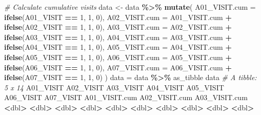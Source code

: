 \documentclass[
]{article}
\newenvironment{Shaded}{\begin{snugshade}}{\end{snugshade}}
\newcommand{\AttributeTok}[1]{\textcolor[rgb]{0.13,0.29,0.53}{#1}}
\newcommand{\CommentTok}[1]{\textcolor[rgb]{0.56,0.35,0.01}{\textit{#1}}}
\newcommand{\DecValTok}[1]{\textcolor[rgb]{0.00,0.00,0.81}{#1}}
\newcommand{\ErrorTok}[1]{\textcolor[rgb]{0.64,0.00,0.00}{\textbf{#1}}}
\newcommand{\FunctionTok}[1]{\textcolor[rgb]{0.13,0.29,0.53}{\textbf{#1}}}
\newcommand{\NormalTok}[1]{#1}
\newcommand{\OtherTok}[1]{\textcolor[rgb]{0.56,0.35,0.01}{#1}}
\newcommand{\SpecialCharTok}[1]{\textcolor[rgb]{0.81,0.36,0.00}{\textbf{#1}}}
\begin{document}
\begin{Shaded}
\begin{Highlighting}[]
\CommentTok{\# Calculate cumulative visits}
\NormalTok{data }\OtherTok{\textless{}{-}}\NormalTok{ data }\SpecialCharTok{\%\textgreater{}\%}
  \FunctionTok{mutate}\NormalTok{(}
    \AttributeTok{A01\_VISIT.cum =} \FunctionTok{ifelse}\NormalTok{(A01\_VISIT }\SpecialCharTok{==} \DecValTok{1}\NormalTok{, }\DecValTok{1}\NormalTok{, }\DecValTok{0}\NormalTok{),}
    \AttributeTok{A02\_VISIT.cum =}\NormalTok{ A01\_VISIT.cum }\SpecialCharTok{+} \FunctionTok{ifelse}\NormalTok{(A02\_VISIT }\SpecialCharTok{==} \DecValTok{1}\NormalTok{, }\DecValTok{1}\NormalTok{, }\DecValTok{0}\NormalTok{),}
    \AttributeTok{A03\_VISIT.cum =}\NormalTok{ A02\_VISIT.cum }\SpecialCharTok{+} \FunctionTok{ifelse}\NormalTok{(A03\_VISIT }\SpecialCharTok{==} \DecValTok{1}\NormalTok{, }\DecValTok{1}\NormalTok{, }\DecValTok{0}\NormalTok{),}
    \AttributeTok{A04\_VISIT.cum =}\NormalTok{ A03\_VISIT.cum }\SpecialCharTok{+} \FunctionTok{ifelse}\NormalTok{(A04\_VISIT }\SpecialCharTok{==} \DecValTok{1}\NormalTok{, }\DecValTok{1}\NormalTok{, }\DecValTok{0}\NormalTok{),}
    \AttributeTok{A05\_VISIT.cum =}\NormalTok{ A04\_VISIT.cum }\SpecialCharTok{+} \FunctionTok{ifelse}\NormalTok{(A05\_VISIT }\SpecialCharTok{==} \DecValTok{1}\NormalTok{, }\DecValTok{1}\NormalTok{, }\DecValTok{0}\NormalTok{),}
    \AttributeTok{A06\_VISIT.cum =}\NormalTok{ A05\_VISIT.cum }\SpecialCharTok{+} \FunctionTok{ifelse}\NormalTok{(A06\_VISIT }\SpecialCharTok{==} \DecValTok{1}\NormalTok{, }\DecValTok{1}\NormalTok{, }\DecValTok{0}\NormalTok{),}
    \AttributeTok{A07\_VISIT.cum =}\NormalTok{ A06\_VISIT.cum }\SpecialCharTok{+} \FunctionTok{ifelse}\NormalTok{(A07\_VISIT }\SpecialCharTok{==} \DecValTok{1}\NormalTok{, }\DecValTok{1}\NormalTok{, }\DecValTok{0}\NormalTok{)}
\NormalTok{  )}
\NormalTok{data }\OtherTok{=}\NormalTok{ data }\SpecialCharTok{\%\textgreater{}\%}\NormalTok{ as\_tibble}
\NormalTok{data}
\CommentTok{\# A tibble: 5 x 14}
\NormalTok{  A01\_VISIT A02\_VISIT A03\_VISIT A04\_VISIT A05\_VISIT A06\_VISIT A07\_VISIT A01\_VISIT.cum A02\_VISIT.cum A03\_VISIT.cum}
      \SpecialCharTok{\textless{}}\NormalTok{dbl}\SpecialCharTok{\textgreater{}}     \ErrorTok{\textless{}}\NormalTok{dbl}\SpecialCharTok{\textgreater{}}     \ErrorTok{\textless{}}\NormalTok{dbl}\SpecialCharTok{\textgreater{}}     \ErrorTok{\textless{}}\NormalTok{dbl}\SpecialCharTok{\textgreater{}}     \ErrorTok{\textless{}}\NormalTok{dbl}\SpecialCharTok{\textgreater{}}     \ErrorTok{\textless{}}\NormalTok{dbl}\SpecialCharTok{\textgreater{}}     \ErrorTok{\textless{}}\NormalTok{dbl}\SpecialCharTok{\textgreater{}}         \ErrorTok{\textless{}}\NormalTok{dbl}\SpecialCharTok{\textgreater{}}         \ErrorTok{\textless{}}\NormalTok{dbl}\SpecialCharTok{\textgreater{}}         \ErrorTok{\textless{}}\NormalTok{dbl}\SpecialCharTok{\textgreater{}}

\end{Highlighting}
\end{Shaded}
\end{document}
